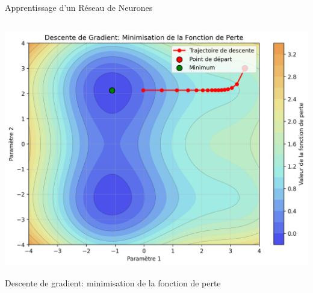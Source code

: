 \documentclass[aspectratio=169,11pt]{beamer}
\begin{document}
\begin{frame}{Apprentissage d'un Réseau de Neurones}
\begin{columns}
\begin{column}{0.4\textwidth}
            \includegraphics[width=\textwidth]{images/gradient_descent.png}
            \vspace{-0.3cm}
            \begin{center}
                \small{Descente de gradient: minimisation de la fonction de perte}
            \end{center}
        \end{column}
    \end{columns}
\end{frame}
\end{document}
